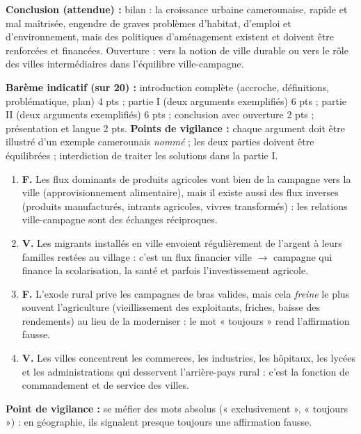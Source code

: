 \documentclass[11pt]{article}
\newcommand{\cle}[1]{{\popxbold\color{popdark}#1}}
\newcounter{popsec}
\newcounter{popsub}
\newcommand{\courssub}[1]{%
  \stepcounter{popsub}%
  \par\vspace{9pt}\noindent{\popxbold\fontsize{11.5}{13}\selectfont\color{popink}{\color{poporange}\thepopsec.\thepopsub}\hspace{6pt}#1}\par\nopagebreak\vspace{4pt}
}
\begin{document}
\begin{corrige}
\textbf{Conclusion (attendue) :} bilan : la croissance urbaine camerounaise, rapide et mal maîtrisée, engendre de graves problèmes d'habitat, d'emploi et d'environnement, mais des politiques d'aménagement existent et doivent être renforcées et financées. Ouverture : vers la notion de ville durable ou vers le rôle des villes intermédiaires dans l'équilibre ville-campagne.

\textbf{Barème indicatif (sur 20) :} introduction complète (accroche, définitions, problématique, plan) 4 pts ; partie I (deux arguments exemplifiés) 6 pts ; partie II (deux arguments exemplifiés) 6 pts ; conclusion avec ouverture 2 pts ; présentation et langue 2 pts. \textbf{Points de vigilance :} chaque argument doit être illustré d'un exemple camerounais \emph{nommé} ; les deux parties doivent être équilibrées ; interdiction de traiter les solutions dans la partie I.
\end{corrige}

\courssub{Dossier 2 : Les relations ville-campagne}

\begin{corrige}
\begin{enumerate}
\item \textbf{F.} Les flux dominants de produits agricoles vont bien de la campagne vers la ville (approvisionnement alimentaire), mais il existe aussi des flux inverses (produits manufacturés, intrants agricoles, vivres transformés) : les relations ville-campagne sont des \cle{échanges réciproques}.
\item \textbf{V.} Les migrants installés en ville envoient régulièrement de l'argent à leurs familles restées au village : c'est un flux financier ville $\to$ campagne qui finance la scolarisation, la santé et parfois l'investissement agricole.
\item \textbf{F.} L'exode rural prive les campagnes de bras valides, mais cela \emph{freine} le plus souvent l'agriculture (vieillissement des exploitants, friches, baisse des rendements) au lieu de la moderniser : le mot « toujours » rend l'affirmation fausse.
\item \textbf{V.} Les villes concentrent les commerces, les industries, les hôpitaux, les lycées et les administrations qui desservent l'arrière-pays rural : c'est la fonction de \cle{commandement} et de service des villes.
\end{enumerate}
\textbf{Point de vigilance :} se méfier des mots absolus (« exclusivement », « toujours ») : en géographie, ils signalent presque toujours une affirmation fausse.
\end{corrige}
\end{document}
